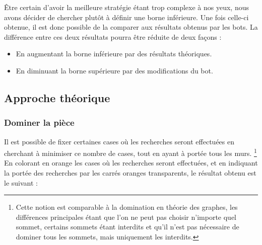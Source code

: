 \documentclass[a4paper,12pt]{article}
\begin{document}
Être certain d'avoir la meilleure stratégie étant trop complexe à nos yeux, nous
avons décider de chercher plutôt à définir une borne inférieure. Une fois
celle-ci obtenue, il est donc possible de la comparer aux résultats obtenus par
les bots. La différence entre ces deux résultats pourra être réduite de deux
façons :
\begin{itemize}
\item En augmentant la borne inférieure par des résultats théoriques.
\item En diminuant la borne supérieure par des modifications du bot.
\end{itemize}

\subsection{Approche théorique}

\subsubsection{Dominer la pièce}
Il est possible de fixer certaines cases où les recherches seront effectuées en
cherchant à minimiser ce nombre de cases, tout en ayant à portée tous les murs.
\footnote{Cette notion est comparable à la domination en théorie des graphes,
  les différences principales étant que l'on ne peut pas choisir n'importe quel
  sommet, certains sommets étant interdits et qu'il n'est pas nécessaire de
  dominer tous les sommets, mais uniquement les interdits.}
\\
En colorant en orange les cases où les recherches seront effectuées, et en
indiquant la portée des recherches par les carrés oranges transparents, le
résultat obtenu est le suivant :
\end{document}
